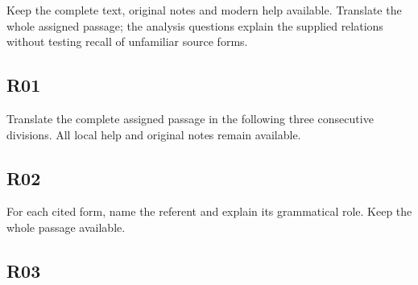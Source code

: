 Keep the complete text, original notes and modern help available. Translate the whole assigned passage; the analysis questions explain the supplied relations without testing recall of unfamiliar source forms.

\subsection*{R01}

Translate the complete assigned passage in the following three consecutive divisions. All local help and original notes remain available.




\subsection*{R02}

For each cited form, name the referent and explain its grammatical role. Keep the whole passage available.




\subsection*{R03}

